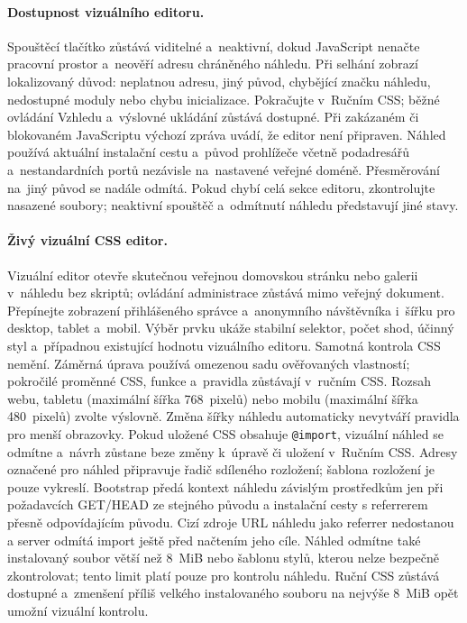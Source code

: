 \documentclass[11pt,a4paper]{article}
\newcommand{\filepath}[1]{\path{#1}}
\newcommand{\codeword}[1]{\nolinkurl{#1}}
\begin{document}
\paragraph{Dostupnost vizuálního editoru.} Spouštěcí tlačítko zůstává viditelné
a~neaktivní, dokud JavaScript nenačte pracovní prostor a~neověří adresu
chráněného náhledu. Při selhání zobrazí lokalizovaný důvod: neplatnou adresu,
jiný původ, chybějící značku náhledu, nedostupné moduly nebo chybu inicializace.
Pokračujte v~Ručním CSS; běžné ovládání Vzhledu a~výslovné ukládání zůstává
dostupné. Při zakázaném či blokovaném JavaScriptu výchozí zpráva uvádí, že
editor není připraven. Náhled používá aktuální instalační cestu a~původ
prohlížeče včetně podadresářů a~nestandardních portů nezávisle na~nastavené
veřejné doméně. Přesměrování na~jiný původ se nadále odmítá. Pokud chybí celá
sekce editoru, zkontrolujte nasazené soubory; neaktivní spouštěč a~odmítnutí
náhledu představují jiné stavy.

\paragraph{Živý vizuální CSS editor.} Vizuální editor otevře skutečnou veřejnou
domovskou stránku nebo galerii v~náhledu bez skriptů; ovládání administrace
zůstává mimo veřejný dokument. Přepínejte zobrazení přihlášeného správce
a~anonymního návštěvníka i~šířku pro desktop, tablet a~mobil. Výběr prvku ukáže
stabilní selektor, počet shod, účinný styl a~případnou existující hodnotu
vizuálního editoru. Samotná kontrola CSS nemění. Záměrná úprava používá omezenou
sadu ověřovaných vlastností; pokročilé proměnné CSS, funkce a~pravidla zůstávají
v~ručním CSS. Rozsah webu, tabletu (maximální šířka 768~pixelů) nebo mobilu
(maximální šířka 480~pixelů) zvolte výslovně. Změna šířky náhledu automaticky
nevytváří pravidla pro menší obrazovky. Pokud uložené CSS obsahuje
\codeword{@import}, vizuální náhled se odmítne a~návrh zůstane beze změny
k~úpravě či uložení v~Ručním CSS. Adresy označené pro náhled připravuje řadič
sdíleného rozložení; šablona rozložení je pouze vykreslí. Bootstrap předá
kontext náhledu závislým prostředkům jen při požadavcích GET/HEAD ze stejného
původu a instalační cesty s referrerem přesně odpovídajícím původu. Cizí zdroje
URL náhledu jako referrer nedostanou a server odmítá import ještě před načtením
jeho cíle. Náhled odmítne také instalovaný soubor
\filepath{public/assets/custom.css} větší než 8~MiB nebo šablonu stylů, kterou
nelze bezpečně zkontrolovat; tento limit platí pouze pro kontrolu náhledu. Ruční
CSS zůstává dostupné a~zmenšení příliš velkého instalovaného souboru na nejvýše
8~MiB opět umožní vizuální kontrolu.
\end{document}
